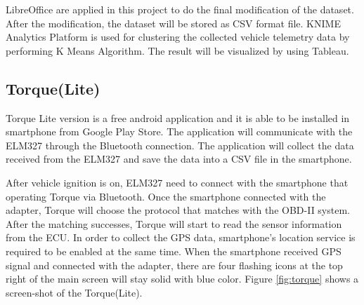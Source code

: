 LibreOffice are applied in this project to do the final modification of the dataset. After the modification, the dataset will be stored as CSV format file. KNIME Analytics Platform is used for clustering the collected vehicle telemetry data by performing K Means Algorithm. The result will be visualized by using Tableau.

\subsection{Torque(Lite)}
Torque Lite version is a free android application and it is able to be installed in smartphone from Google Play Store. The application will communicate with the ELM327 through the Bluetooth connection. The application will collect the data received from the ELM327 and  save the data into a CSV file in the smartphone. 

After vehicle ignition is on, ELM327 need to connect with the smartphone that operating Torque via Bluetooth. Once the smartphone connected with the adapter, Torque will choose the protocol that matches with the OBD-II system. After the matching successes, Torque will start to read the sensor information from the ECU. In order to collect the GPS data, smartphone's location service is required to be enabled at the same time. When the smartphone received GPS signal and connected with the adapter, there are four flashing icons at the top right of the main screen will stay solid with blue color. Figure \ref{fig:torque} shows a screen-shot of the Torque(Lite).

